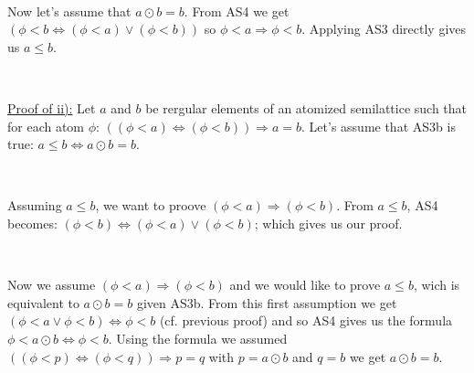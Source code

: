 \documentclass[a4paper, 11pt]{article}
\begin{document}
\

Now let's assume that $a \odot b = b$. From AS4 we get $(\phi < b \Leftrightarrow (\phi < a) \lor (\phi < b))$ so $\phi < a \Rightarrow \phi < b$. Applying AS3 directly gives us $a \leq b$.

\

\noindent
\underline{Proof of ii):} Let $a$ and $b$ be rergular elements of an atomized semilattice such that for each atom $\phi$: $((\phi < a) \Leftrightarrow (\phi <  b)) \Rightarrow a = b$. Let's assume that AS3b is true: $a \leq b \Leftrightarrow a \odot b = b$.

\

Assuming $a \leq b$, we want to proove $(\phi < a) \Rightarrow (\phi < b)$. From $a \leq b$, AS4 becomes: $(\phi < b) \Leftrightarrow (\phi < a) \lor (\phi < b)$; which gives us our proof.

\

Now we assume $(\phi < a) \Rightarrow (\phi < b)$ and we would like to prove $a \leq b$, wich is equivalent to $a \odot b = b$ given AS3b. From this first assumption we get $(\phi < a \lor \phi < b) \Leftrightarrow \phi < b$ (cf. previous proof) and so AS4 gives us the formula $\phi < a \odot b \Leftrightarrow \phi < b$. Using the formula we assumed $((\phi < p) \Leftrightarrow (\phi < q)) \Rightarrow p = q$ with $p = a \odot b$ and $q = b$ we get $a \odot b = b$.
\end{document}
